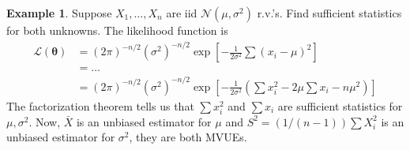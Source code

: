 \documentclass{book}
\theoremstyle{definition}
\newtheorem{exmp}{Example}[section]
\newcommand{\lag}{\mathcal{L}}
\newcommand{\nn}{\nonumber}
\newcommand{\N}{\mathcal{N}}
\newcommand{\f}[2]{\frac{#1}{#2}}
\newcommand{\lp}{\left(}
\newcommand{\rp}{\right)}
\newcommand{\lb}{\left[}
\newcommand{\rb}{\right]}
\begin{document}
\begin{exmp}
	Suppose $X_1,\dots,X_n$ are iid $\N(\mu,\sigma^2)$ r.v.'s. Find sufficient statistics for both unknowns. The likelihood function is 
	\begin{align}
	\lag(\bm\theta) &= (2\pi)^{-n/2}(\sigma^2)^{-n/2}\exp\lb -\f{1}{2\sigma^2}\sum (x_i - \mu)^2 \rb\nn\\
	&= \dots\nn\\
	&= (2\pi )^{-n/2}(\sigma^2)^{-n/2}\exp\lb -\f{1}{2\sigma^2}\lp \sum x_i^2 -2\mu \sum x_i - n\mu^2 \rp \rb
	\end{align}
	The factorization theorem tells us that $\sum x_i^2$ and $\sum x_i$ are sufficient statistics for $\mu,\sigma^2$. Now, $\bar{X}$ is an unbiased estimator for $\mu$ and $S^2 = (1/(n-1))\sum X_i^2$ is an unbiased estimator for $\sigma^2$, they are both MVUEs.   
\end{exmp}
\end{document}
